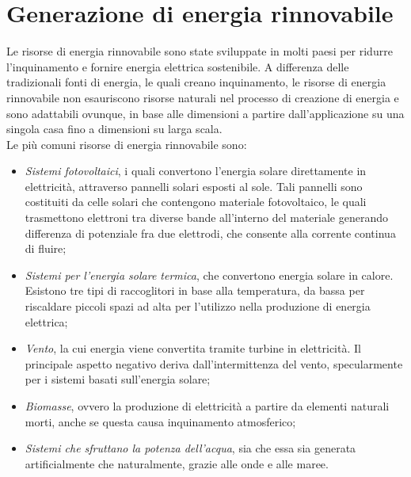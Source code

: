 \section{Generazione di energia rinnovabile}
Le risorse di energia rinnovabile sono state sviluppate in molti paesi per ridurre l'inquinamento e fornire energia elettrica sostenibile. A differenza delle tradizionali fonti di energia, le quali creano inquinamento, le risorse di energia rinnovabile non esauriscono risorse naturali nel processo di creazione di energia e sono adattabili ovunque, in base alle dimensioni a partire dall'applicazione su una singola casa fino a dimensioni su larga scala.
\\
Le più comuni risorse di energia rinnovabile sono:
\begin{itemize}
	\item \emph{Sistemi fotovoltaici}, i quali convertono l'energia solare direttamente in elettricità, attraverso pannelli solari esposti al sole. Tali pannelli sono costituiti da celle solari che contengono materiale fotovoltaico, le quali trasmettono elettroni tra diverse bande all'interno del materiale generando differenza di potenziale fra due elettrodi, che consente alla corrente continua di fluire;
	\item \emph{Sistemi per l'energia solare termica}, che convertono energia solare in calore. Esistono tre tipi di raccoglitori in base alla temperatura, da bassa per riscaldare piccoli spazi ad alta per l'utilizzo nella produzione di energia elettrica;
	\item \emph{Vento}, la cui energia viene convertita tramite turbine in elettricità. Il principale aspetto negativo deriva dall'intermittenza del vento, specularmente per i sistemi basati sull'energia solare;
	\item \emph{Biomasse}, ovvero la produzione di elettricità a partire da elementi naturali morti, anche se questa causa inquinamento atmosferico;
	\item \emph{Sistemi che sfruttano la potenza dell'acqua}, sia che essa sia generata artificialmente che naturalmente, grazie alle onde e alle maree.   
\end{itemize} 

 
